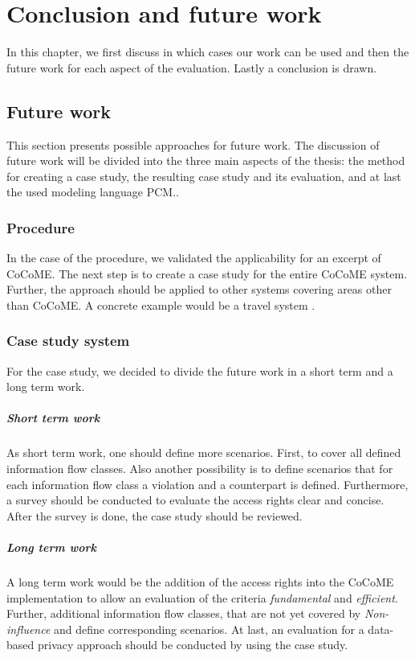 
\chapter{Conclusion and future work}
\label{ch:Conclusion}
In this chapter, we first discuss in which cases our work can be used and then the future work for each aspect of the evaluation. Lastly a conclusion is drawn.
\section{Future work} 
\label{FW}
This section presents possible approaches for future work. The discussion of future work will be divided into the three main aspects of the thesis: the method for creating a case study, the resulting case study and its evaluation, and at last the used modeling language PCM.. 
\subsection{Procedure}
In the case of the procedure, we validated the applicability for an excerpt of CoCoME. The next step is to create a case study for the entire CoCoME system. Further, the approach should be applied to other systems covering areas other than CoCoME. A concrete example would be a travel system \cite{Travelsystem}.
\subsection{Case study system}
For the case study, we decided to divide the future work in a short term and a long term work.\\
\paragraph{Short term work}
As short term work, one should define more scenarios. First, to cover all defined information flow classes. Also another possibility is to define scenarios that for each information flow class a violation and a counterpart is defined. Furthermore, a survey should be conducted to evaluate the access rights clear and concise. After the survey is done, the case study should be reviewed.
\paragraph{Long term work}
A long term work would be the addition of the access rights into the CoCoME implementation to allow an evaluation of the criteria \textit{fundamental} and \textit{efficient}. Further, additional information flow classes, that are not yet covered by \textit{Non-influence} and define corresponding scenarios. At last, an evaluation for a data-based privacy approach should be conducted by using the case study. 
